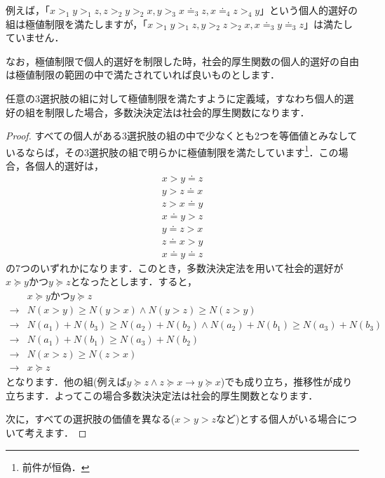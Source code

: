例えば，「$x >_1 y >_1 z, z >_2 y >_2 x, y >_3 x \doteq_3 z, x \doteq_4 z >_4 y$」という個人的選好の組は極値制限を満たしますが，「$x >_1 y >_1 z, y >_2 z >_2 x, x \doteq_3 y \doteq_3 z$」は満たしていません．

なお，極値制限で個人的選好を制限した時，社会的厚生関数の個人的選好の自由は極値制限の範囲の中で満たされていれば良いものとします．

\begin{thm}\label{thm:52}
   任意の3選択肢の組に対して極値制限を満たすように定義域，すなわち個人的選好の組を制限した場合，多数決決定法は社会的厚生関数になります．
\end{thm}

\begin{proof}
すべての個人がある3選択肢の組の中で少なくとも2つを等価値とみなしているならば，その3選択肢の組で明らかに極値制限を満たしています\footnote{前件が恒偽．}．この場合，各個人的選好は，
\begin{align}
    x > y \doteq z  \tag{$a_1$}\\
    y > z \doteq x  \tag{$a_2$}\\
    z > x \doteq y  \tag{$a_3$}\\
    x \doteq y > z  \tag{$b_1$}\\
    y \doteq z > x  \tag{$b_2$}\\
    z \doteq x > y  \tag{$b_3$}\\
    x \doteq y \doteq z \tag{$c$}
\end{align}
の7つのいずれかになります．このとき，多数決決定法を用いて社会的選好が$x \succeq y $かつ$y \succeq z$となったとします．すると，
\begin{align*}
        & x \succeq y かつ y \succeq z \\
    \to & N(x > y) \geq N(y > x) \land N(y > z) \geq N(z > y) \\
    \to & N(a_1) + N(b_3) \geq N(a_2) + N(b_2) \land N(a_2) + N(b_1) \geq N(a_3) + N(b_3) \\
    \to & N(a_1) + N(b_1) \geq N(a_3) + N(b_2) \\
    \to & N(x > z) \geq N(z > x) \\
    \to & x \succeq z
\end{align*}
となります．他の組(例えば$y \succeq z \land z \succeq x \to y \succeq x$)でも成り立ち，推移性が成り立ちます．よってこの場合多数決決定法は社会的厚生関数となります．

次に，すべての選択肢の価値を異なる($x>y>z$など)とする個人がいる場合について考えます．


\end{proof}
